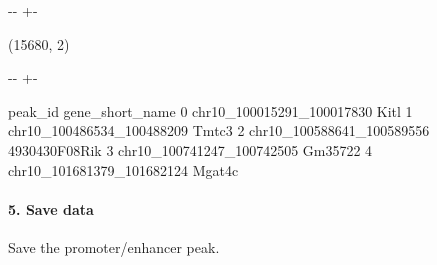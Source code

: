 \documentclass[letterpaper,10pt,english]{sphinxmanual}
\newlength\nbsphinxcodecellspacing
\begin{document}
{

\kern-\sphinxverbatimsmallskipamount\kern-\baselineskip
\kern+\FrameHeightAdjust\kern-\fboxrule
\vspace{\nbsphinxcodecellspacing}

\begin{sphinxVerbatim}[commandchars=\\\{\}]
(15680, 2)
\end{sphinxVerbatim}
}

{

\kern-\sphinxverbatimsmallskipamount\kern-\baselineskip
\kern+\FrameHeightAdjust\kern-\fboxrule
\vspace{\nbsphinxcodecellspacing}

\begin{sphinxVerbatim}[commandchars=\\\{\}]
\llap{\color{nbsphinxout}[10]:\,\hspace{\fboxrule}\hspace{\fboxsep}}                     peak\_id gene\_short\_name
0  chr10\_100015291\_100017830            Kitl
1  chr10\_100486534\_100488209           Tmtc3
2  chr10\_100588641\_100589556   4930430F08Rik
3  chr10\_100741247\_100742505         Gm35722
4  chr10\_101681379\_101682124          Mgat4c
\end{sphinxVerbatim}
}


\paragraph{5. Save data}
\label{\detokenize{notebooks/01_ATAC-seq_data_processing/option1_scATAC-seq_data_analysis_with_cicero/02_preprocess_peak_data:5.-Save-data}}
Save the promoter/enhancer peak.

{
\begin{sphinxVerbatim}[commandchars=\\\{\}]
\llap{\color{nbsphinxin}[11]:\,\hspace{\fboxrule}\hspace{\fboxsep}}
\end{sphinxVerbatim}
}
\end{document}
